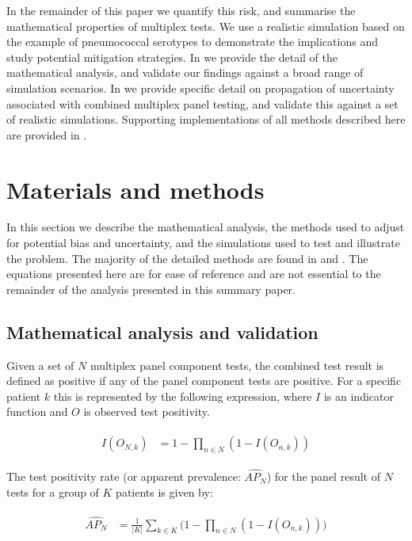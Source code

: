 \documentclass[10pt,letterpaper]{article}
\begin{document}
In the remainder of this paper we quantify this risk, and summarise the mathematical properties of multiplex tests. We use a realistic simulation based on the example of pneumococcal serotypes to demonstrate the implications and study potential mitigation strategies. In  we provide the detail of the mathematical analysis, and validate our findings against a broad range of simulation scenarios. In  we provide specific detail on propagation of uncertainty associated with combined multiplex panel testing, and validate this against a set of realistic simulations. Supporting implementations of all methods described here are provided in .

\section*{Materials and methods}

In this section we describe the mathematical analysis, the methods used to adjust for potential bias and uncertainty, and the simulations used to test and illustrate the problem. The majority of the detailed methods are found in  and . The equations presented here are for ease of reference and are not essential to the remainder of the analysis presented in this summary paper.

\subsection*{Mathematical analysis and validation}

Given a set of \(N\) multiplex panel component tests, the combined test result is defined as positive if any of the panel component tests are positive. For a specific patient \(k\) this is represented by the following expression, where \(I\) is an indicator function and \(O\) is observed test positivity.

\begin{eqnarray}
\begin{aligned}
I(O_{N,k}) &= 1-\prod_{n \in N}{(1-I(O_{n,k}))}
\end{aligned}
\end{eqnarray}

The test positivity rate (or apparent prevalence: \(\widehat{AP_N}\)) for the panel result of \(N\) tests for a group of \(K\) patients is given by:

\begin{eqnarray}
\begin{aligned}
\widehat{AP_N} &= \frac{1}{|K|}\sum_{k \in K}{\bigg(1-\prod_{n \in N}{(1-I(O_{n,k}))}\bigg)}
\end{aligned}
\end{eqnarray}
\end{document}

